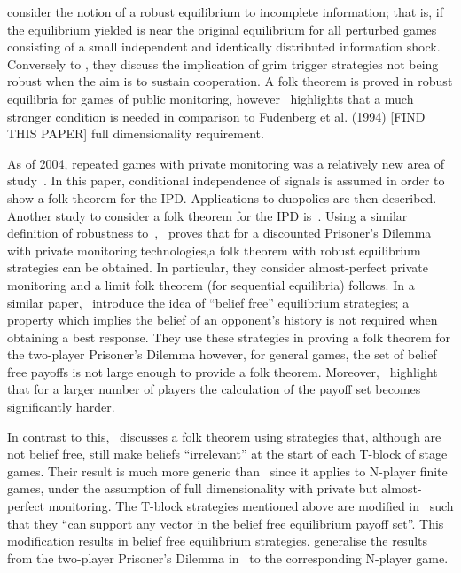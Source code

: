 \cite{Chassang2011} consider the notion of a robust equilibrium to incomplete
information; that is, if the equilibrium yielded is near the original
equilibrium for all perturbed games consisting of a small independent and
identically distributed information shock. Conversely to \cite{Friedman1971},
they discuss the implication of grim trigger strategies not being robust when
the aim is to sustain cooperation. A folk theorem is proved in robust equilibria
for games of public monitoring, however~\cite{Chassang2011} highlights that a
much stronger condition is needed in comparison to Fudenberg et al. (1994) [FIND
THIS PAPER] full
dimensionality requirement.

As of 2004, repeated games with private monitoring was a relatively new area of
study~\cite{Matsushima2004}. In this paper, conditional independence of signals
is assumed in order to show a folk theorem for the IPD. Applications to
duopolies are then described. Another study to consider a folk theorem for the
IPD is~\cite{Ely2002}. Using a similar definition of robustness
to~\cite{Chassang2011},~\cite{Ely2002} proves that for a discounted Prisoner's
Dilemma with private monitoring technologies,a folk theorem with robust
equilibrium strategies can be obtained. In particular, they consider
almost-perfect private monitoring and a limit folk theorem (for sequential
equilibria) follows. In a similar paper,~\cite{Ely2005} introduce the idea of
``belief free'' equilibrium strategies; a property which implies the belief of
an opponent's history is not required when obtaining a best response. They use
these strategies in proving a folk theorem for the two-player Prisoner's Dilemma
however, for general games, the set of belief free payoffs is not large enough
to provide a folk theorem. Moreover,~\cite{Ely2005} highlight that for a larger
number of players the calculation of the payoff set becomes significantly
harder.

In contrast to this,~\cite{Horner2006} discusses a folk theorem using strategies
that, although are not belief free, still make beliefs ``irrelevant'' at the
start of each T-block of stage games. Their result is much more generic
than~\cite{Ely2005} since it applies to N-player finite games, under the
assumption of full dimensionality with private but almost-perfect monitoring.
The T-block strategies mentioned above are modified in~\cite{Yamamoto2009,
Yamamoto2012} such that they ``can support any vector in the belief free
equilibrium payoff set''. This modification results in belief free equilibrium
strategies. \cite{Yamamoto2009, Yamamoto2012} generalise the results from the
two-player Prisoner's Dilemma in~\cite{Ely2005} to the corresponding N-player game.


